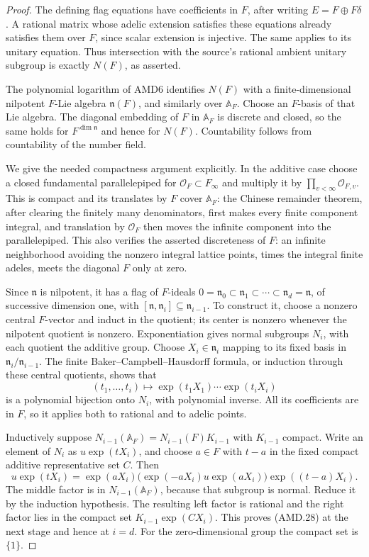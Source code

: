 \begin{proof}
The defining flag equations have coefficients in \(F\), after
writing \(E=F\oplus F\delta\).  A rational matrix whose
adelic extension satisfies these equations already satisfies
them over \(F\), since scalar extension is injective.  The
same applies to its unitary equation.  Thus intersection with
the source's rational ambient unitary subgroup is exactly
\(N(F)\), as asserted.

The polynomial logarithm of AMD6 identifies \(N(F)\) with
a finite-dimensional nilpotent \(F\)-Lie algebra
\(\mathfrak n(F)\), and similarly over \(\mathbb A_F\).
Choose an \(F\)-basis of that Lie algebra.  The diagonal
embedding of \(F\) in \(\mathbb A_F\) is discrete and
closed, so the same holds for \(F^{\dim\mathfrak n}\) and
hence for \(N(F)\).  Countability follows from countability
of the number field.

We give the needed compactness argument explicitly.  In the
additive case choose a closed fundamental parallelepiped for
\(\mathcal O_F\subset F_\infty\) and multiply it by
\(\prod_{v<\infty}\mathcal O_{F,v}\).  This is compact and
its translates by \(F\) cover \(\mathbb A_F\): the Chinese
remainder theorem, after clearing the finitely many denominators,
first makes every finite component integral, and translation by
\(\mathcal O_F\) then moves the infinite component into the
parallelepiped.  This also verifies the asserted discreteness
of \(F\): an infinite neighborhood avoiding the nonzero
integral lattice points, times the integral finite adeles,
meets the diagonal \(F\) only at zero.

Since \(\mathfrak n\) is nilpotent, it has a flag of
\(F\)-ideals
\(0=\mathfrak n_0\subset\mathfrak n_1\subset\cdots
\subset\mathfrak n_d=\mathfrak n\), of successive dimension
one, with \([\mathfrak n,\mathfrak n_i]\subseteq\mathfrak n_{i-1}\).
To construct it, choose a nonzero central \(F\)-vector and
induct in the quotient; its center is nonzero whenever the
nilpotent quotient is nonzero.  Exponentiation gives normal
subgroups \(N_i\), with each quotient the additive group.
Choose \(X_i\in\mathfrak n_i\) mapping to its fixed basis
in \(\mathfrak n_i/\mathfrak n_{i-1}\).  The finite
Baker--Campbell--Hausdorff formula, or induction through these
central quotients, shows that
\[
 (t_1,\ldots,t_i)\longmapsto
             \exp(t_1X_1)\cdots\exp(t_iX_i)
 \tag{AMD.29}
\]
is a polynomial bijection onto \(N_i\), with polynomial
inverse.  All its coefficients are in \(F\), so it applies
both to rational and to adelic points.

Inductively suppose \(N_{i-1}(\mathbb A_F)=N_{i-1}(F)K_{i-1}\)
with \(K_{i-1}\) compact.  Write an element of \(N_i\) as
\(u\exp(tX_i)\), and choose \(a\in F\) with \(t-a\)
in the fixed compact additive representative set \(C\).
Then
\[
 u\exp(tX_i)=\exp(aX_i)
   \bigl(\exp(-aX_i)u\exp(aX_i)\bigr)\exp((t-a)X_i).
 \tag{AMD.30}
\]
The middle factor is in \(N_{i-1}(\mathbb A_F)\), because
that subgroup is normal.  Reduce it by the induction hypothesis.
The resulting left factor is rational and the right factor lies
in the compact set \(K_{i-1}\exp(CX_i)\).  This proves
(AMD.28) at the next stage and hence at \(i=d\).
For the zero-dimensional group the compact set is \(\{1\}\).
\end{proof}
